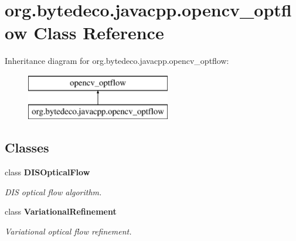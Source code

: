 \hypertarget{classorg_1_1bytedeco_1_1javacpp_1_1opencv__optflow}{}\section{org.\+bytedeco.\+javacpp.\+opencv\+\_\+optflow Class Reference}
\label{classorg_1_1bytedeco_1_1javacpp_1_1opencv__optflow}
Inheritance diagram for org.\+bytedeco.\+javacpp.\+opencv\+\_\+optflow\+:\begin{figure}[H]
\begin{center}
\leavevmode
\includegraphics[height=2.000000cm]{classorg_1_1bytedeco_1_1javacpp_1_1opencv__optflow}
\end{center}
\end{figure}
\subsection*{Classes}
\begin{DoxyCompactItemize}
\item 
class {\bfseries D\+I\+S\+Optical\+Flow}
\begin{DoxyCompactList}\small\item\em D\+IS optical flow algorithm. \end{DoxyCompactList}\item 
class {\bfseries Variational\+Refinement}
\begin{DoxyCompactList}\small\item\em Variational optical flow refinement. \end{DoxyCompactList}\end{DoxyCompactItemize}
